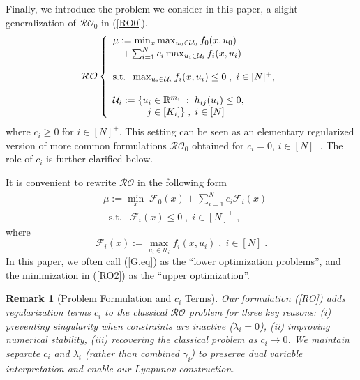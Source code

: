 \documentclass[journal,twoside,web]{ieeecolor}
\newcommand{\rev}[1]{\textcolor{revisionblue}{#1}}
\newtheorem{remark}{Remark}
\begin{document}
Finally, we introduce the problem we consider in this paper, a slight generalization of $\mathcal{RO}_0$ in (\ref{RO0}).
\begin{equation}\mathcal{RO}\left\{\begin{array}{l}
\mu:=\min_{x} \max_{u_0\in \mathcal{U}_0} f_0(x,u_0)\\
\quad +\sum_{i=1}^N c_i \max_{u_i\in \mathcal{U}_i} f_i(x,u_i)\label{RO}\\ \\
\text{s.t.}\;\;\max_{u_i\in \mathcal{U}_i} f_i(x,u_i)\leq 0\;,\;i\in[N]^+,\\ \\
\mathcal{U}_i:=\{u_i\in \mathbb{R}^{m_i}\;:\;h_{ij}(u_i)\leq 0,\\
\hspace{3.5em} j\in[K_i]\}\;,\;i\in[N]
\end{array}\right.
\end{equation}
where $c_i\geq 0$ for $i\in[N]^+$. This setting can be seen as an elementary regularized version of more common formulations $\mathcal{RO}_0$ obtained for $c_i=0$, $i\in[N]^+$.
The role of $c_i$ is further clarified below.

It is convenient to rewrite $\mathcal{RO}$ in the following form
\begin{align}
&\mu:=\underset{x}{\min} \; \mathcal{F}_0(x)+\sum_{i=1}^N c_i\mathcal{F}_i(x)\label{RO2}\\
&\;\;\text{s.t.}\;\;\;\mathcal{F}_i(x)\leq 0\;,\;i\in[N]^+\;,\nonumber
\end{align}
where
\begin{equation}\label{G.eq}
\mathcal{F}_i(x):=\max_{u_i\in \mathcal{U}_i} f_i(x,u_i)\;,\; i\in[N]\;.
\end{equation}
In this paper, we often call (\ref{G.eq}) as the ``lower optimization problems'', and the minimization in (\ref{RO2}) as the ``upper optimization''.

\begin{remark}[\rev{Problem Formulation and $c_i$ Terms}]
\rev{Our formulation (\ref{RO}) adds regularization terms $c_i$ to the classical $\mathcal{RO}$ problem for three key reasons: (i) preventing singularity when constraints are inactive ($\lambda_i = 0$), (ii) improving numerical stability, (iii) recovering the classical problem as $c_i \to 0$. We maintain separate $c_i$ and $\lambda_i$ (rather than combined $\gamma_i$) to preserve dual variable interpretation and enable our Lyapunov construction.}
\end{remark}
\end{document}
